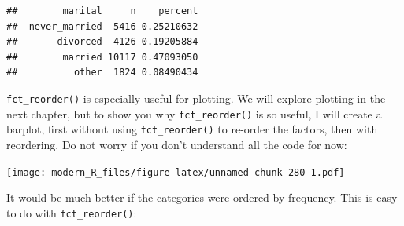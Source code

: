 \documentclass[]{gitbook}
\newenvironment{Shaded}{\begin{snugshade}}{\end{snugshade}}
\newcommand{\DataTypeTok}[1]{\textcolor[rgb]{0.13,0.29,0.53}{#1}}
\newcommand{\FloatTok}[1]{\textcolor[rgb]{0.00,0.00,0.81}{#1}}
\newcommand{\KeywordTok}[1]{\textcolor[rgb]{0.13,0.29,0.53}{\textbf{#1}}}
\newcommand{\NormalTok}[1]{#1}
\newcommand{\OperatorTok}[1]{\textcolor[rgb]{0.81,0.36,0.00}{\textbf{#1}}}
\newcommand{\OtherTok}[1]{\textcolor[rgb]{0.56,0.35,0.01}{#1}}
\newcommand{\StringTok}[1]{\textcolor[rgb]{0.31,0.60,0.02}{#1}}
\theoremstyle{definition}
\theoremstyle{definition}
\theoremstyle{definition}
\theoremstyle{remark}
\begin{document}
\begin{Shaded}
\end{Shaded}

\begin{verbatim}
##        marital     n    percent
##  never_married  5416 0.25210632
##       divorced  4126 0.19205884
##        married 10117 0.47093050
##          other  1824 0.08490434
\end{verbatim}

\texttt{fct\_reorder()} is especially useful for plotting. We will
explore plotting in the next chapter, but to show you why
\texttt{fct\_reorder()} is so useful, I will create a barplot, first
without using \texttt{fct\_reorder()} to re-order the factors, then with
reordering. Do not worry if you don't understand all the code for now:

\begin{Shaded}
\end{Shaded}

\texttt{[image: modern\_R\_files/figure-latex/unnamed-chunk-280-1.pdf]}

It would be much better if the categories were ordered by frequency.
This is easy to do with \texttt{fct\_reorder()}:

\begin{Shaded}
\end{Shaded}
\end{document}
